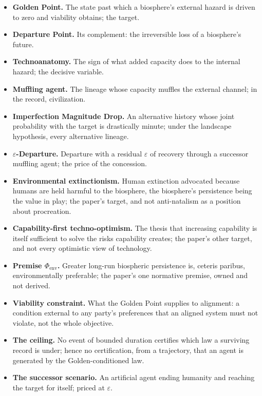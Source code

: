 \documentclass[11pt]{article}
\theoremstyle{plain}
\theoremstyle{definition}
\theoremstyle{remark}
\begin{document}
\begin{itemize}[itemsep=2pt]
\item \textbf{Golden Point.} The state past which a biosphere's external
hazard is driven to zero and viability obtains; the target.
\item \textbf{Departure Point.} Its complement: the irreversible loss of a
biosphere's future.
\item \textbf{Technoanatomy.} The sign of what added capacity does to the
internal hazard; the decisive variable.
\item \textbf{Muffling agent.} The lineage whose capacity muffles the
external channel; in the record, civilization.
\item \textbf{Imperfection Magnitude Drop.} An alternative history whose
joint probability with the target is drastically minute; under the
landscape hypothesis, every alternative lineage.
\item \textbf{$\varepsilon$-Departure.} Departure with a residual
$\varepsilon$ of recovery through a successor muffling agent; the price
of the concession.
\item \textbf{Environmental extinctionism.} Human extinction advocated
because humans are held harmful to the biosphere, the biosphere's
persistence being the value in play; the paper's target, and not
anti-natalism as a position about procreation.
\item \textbf{Capability-first techno-optimism.} The thesis that
increasing capability is itself sufficient to solve the risks
capability creates; the paper's other target, and not every optimistic
view of technology.
\item \textbf{Premise $\Phi_{\mathrm{env}}$.} Greater long-run
biospheric persistence is, ceteris paribus, environmentally preferable;
the paper's one normative premise, owned and not derived.
\item \textbf{Viability constraint.} What the Golden Point supplies to
alignment: a condition external to any party's preferences that an
aligned system must not violate, not the whole objective.
\item \textbf{The ceiling.} No event of bounded duration certifies which
law a surviving record is under; hence no certification, from a
trajectory, that an agent is generated by the Golden-conditioned law.
\item \textbf{The successor scenario.} An artificial agent ending
humanity and reaching the target for itself; priced at $\varepsilon$.
\end{itemize}
\end{document}
